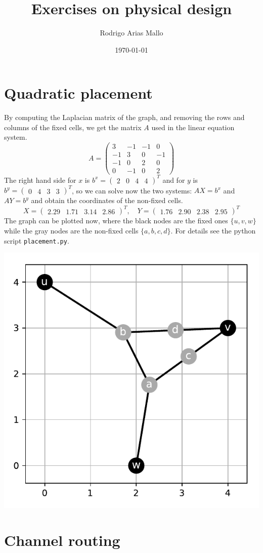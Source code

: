 \documentclass[a4paper]{article}
\title{Exercises on physical design}
\author{Rodrigo Arias Mallo}
\date{\today}
\newcommand*\mat[1]{ \begin{pmatrix} #1 \end{pmatrix}}
\begin{document}
\maketitle

\section{Quadratic placement}


By computing the Laplacian matrix of the graph, and removing the rows and 
columns of the fixed cells, we get the matrix $A$ used in the linear equation 
system.
%
$$ A = \mat{
	 3 & -1 & -1 &  0 \\
	-1 &  3 &  0 & -1 \\
	-1 &  0 &  2 &  0 \\
	 0 & -1 &  0 &  2}$$
%
The right hand side for $x$ is $b^x = \mat{2 & 0 & 4 & 4}^T$ and for $y$ is $b^y 
= \mat{0 & 4 & 3 & 3}^T$, so we can solve now the two systems: $AX = b^x$ and 
$AY = b^y$ and obtain the coordinates of the non-fixed cells.
%
$$ X = \mat{2.29 & 1.71 & 3.14 & 2.86}^T,\quad
Y = \mat{1.76 & 2.90 & 2.38 & 2.95}^T $$
%
The graph can be plotted now, where the black nodes are the fixed ones 
$\{u,v,w\}$ while the gray nodes are the non-fixed cells $\{a,b,c,d\}$. For 
details see the python script \texttt{placement.py}.
%
\begin{center}
\includegraphics[width=.7\textwidth]{graph.pdf}
\end{center}
%
\section{Channel routing}
\end{document}
